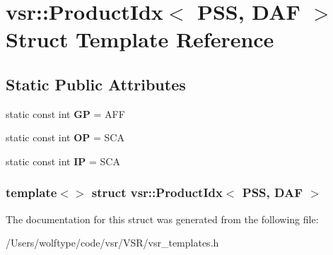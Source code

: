 \hypertarget{structvsr_1_1_product_idx_3_01_p_s_s_00_01_d_a_f_01_4}{\section{vsr\-:\-:Product\-Idx$<$ P\-S\-S, D\-A\-F $>$ Struct Template Reference}
\label{structvsr_1_1_product_idx_3_01_p_s_s_00_01_d_a_f_01_4}
}
\subsection*{Static Public Attributes}
\begin{DoxyCompactItemize}
\item 
\hypertarget{structvsr_1_1_product_idx_3_01_p_s_s_00_01_d_a_f_01_4_aa47a18b579b861460ac92881bfcf3b37}{static const int {\bfseries G\-P} = A\-F\-F}\label{structvsr_1_1_product_idx_3_01_p_s_s_00_01_d_a_f_01_4_aa47a18b579b861460ac92881bfcf3b37}

\item 
\hypertarget{structvsr_1_1_product_idx_3_01_p_s_s_00_01_d_a_f_01_4_a0f3f4217c8da5335ab58090b8bc098f4}{static const int {\bfseries O\-P} = S\-C\-A}\label{structvsr_1_1_product_idx_3_01_p_s_s_00_01_d_a_f_01_4_a0f3f4217c8da5335ab58090b8bc098f4}

\item 
\hypertarget{structvsr_1_1_product_idx_3_01_p_s_s_00_01_d_a_f_01_4_a0176fefe1c5914bb32c87470fa614764}{static const int {\bfseries I\-P} = S\-C\-A}\label{structvsr_1_1_product_idx_3_01_p_s_s_00_01_d_a_f_01_4_a0176fefe1c5914bb32c87470fa614764}

\end{DoxyCompactItemize}
\subsubsection*{template$<$$>$ struct vsr\-::\-Product\-Idx$<$ P\-S\-S, D\-A\-F $>$}



The documentation for this struct was generated from the following file\-:\begin{DoxyCompactItemize}
\item 
/\-Users/wolftype/code/vsr/\-V\-S\-R/vsr\-\_\-templates.\-h\end{DoxyCompactItemize}
